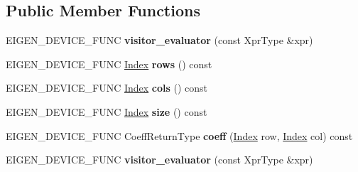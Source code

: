 \subsection*{Public Member Functions}
\begin{DoxyCompactItemize}
\item 
\mbox{\label{class_eigen_1_1internal_1_1visitor__evaluator_a7cdf20b122dd158ae4a9c74d42b95a82}} 
E\+I\+G\+E\+N\+\_\+\+D\+E\+V\+I\+C\+E\+\_\+\+F\+U\+NC {\bfseries visitor\+\_\+evaluator} (const Xpr\+Type \&xpr)
\item 
\mbox{\label{class_eigen_1_1internal_1_1visitor__evaluator_ac7c271a469132b85dfb9028d021ca892}} 
E\+I\+G\+E\+N\+\_\+\+D\+E\+V\+I\+C\+E\+\_\+\+F\+U\+NC \hyperlink{namespace_eigen_a62e77e0933482dafde8fe197d9a2cfde}{Index} {\bfseries rows} () const
\item 
\mbox{\label{class_eigen_1_1internal_1_1visitor__evaluator_a0fd477b31b38a52ce7fa858e6f744c5d}} 
E\+I\+G\+E\+N\+\_\+\+D\+E\+V\+I\+C\+E\+\_\+\+F\+U\+NC \hyperlink{namespace_eigen_a62e77e0933482dafde8fe197d9a2cfde}{Index} {\bfseries cols} () const
\item 
\mbox{\label{class_eigen_1_1internal_1_1visitor__evaluator_a6dd9ece79764a4efc19b33cbf22f6528}} 
E\+I\+G\+E\+N\+\_\+\+D\+E\+V\+I\+C\+E\+\_\+\+F\+U\+NC \hyperlink{namespace_eigen_a62e77e0933482dafde8fe197d9a2cfde}{Index} {\bfseries size} () const
\item 
\mbox{\label{class_eigen_1_1internal_1_1visitor__evaluator_ac46afdb69f8a6b864b619cd2028ba7e5}} 
E\+I\+G\+E\+N\+\_\+\+D\+E\+V\+I\+C\+E\+\_\+\+F\+U\+NC Coeff\+Return\+Type {\bfseries coeff} (\hyperlink{namespace_eigen_a62e77e0933482dafde8fe197d9a2cfde}{Index} row, \hyperlink{namespace_eigen_a62e77e0933482dafde8fe197d9a2cfde}{Index} col) const
\item 
\mbox{\label{class_eigen_1_1internal_1_1visitor__evaluator_a7cdf20b122dd158ae4a9c74d42b95a82}} 
E\+I\+G\+E\+N\+\_\+\+D\+E\+V\+I\+C\+E\+\_\+\+F\+U\+NC {\bfseries visitor\+\_\+evaluator} (const Xpr\+Type \&xpr)

\end{DoxyCompactItemize}
